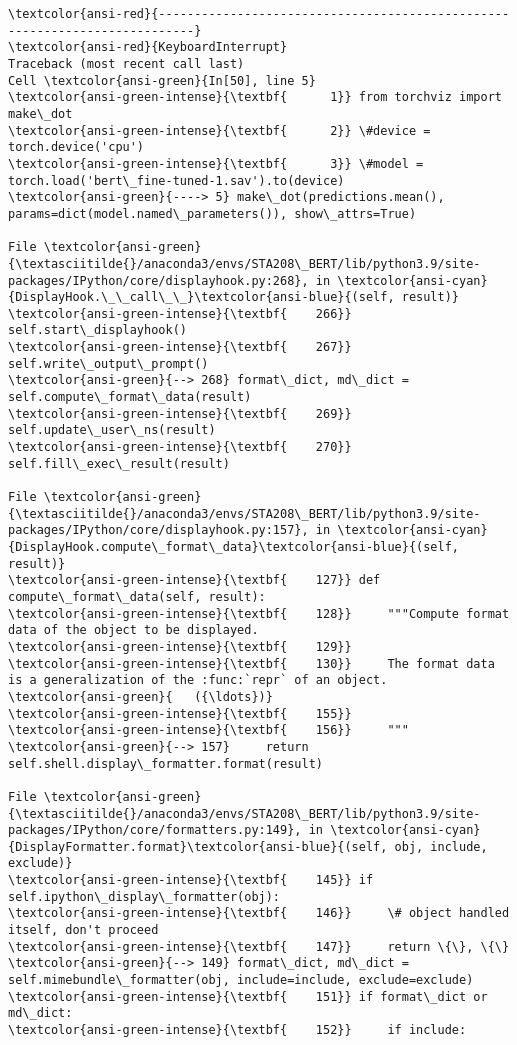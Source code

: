 \documentclass[11pt]{article}
\begin{document}
    \begin{Verbatim}[commandchars=\\\{\}, frame=single, framerule=2mm, rulecolor=\color{outerrorbackground}]
\textcolor{ansi-red}{---------------------------------------------------------------------------}
\textcolor{ansi-red}{KeyboardInterrupt}                         Traceback (most recent call last)
Cell \textcolor{ansi-green}{In[50], line 5}
\textcolor{ansi-green-intense}{\textbf{      1}} from torchviz import make\_dot
\textcolor{ansi-green-intense}{\textbf{      2}} \#device = torch.device('cpu')
\textcolor{ansi-green-intense}{\textbf{      3}} \#model = torch.load('bert\_fine-tuned-1.sav').to(device)
\textcolor{ansi-green}{----> 5} make\_dot(predictions.mean(), params=dict(model.named\_parameters()), show\_attrs=True)

File \textcolor{ansi-green}{\textasciitilde{}/anaconda3/envs/STA208\_BERT/lib/python3.9/site-packages/IPython/core/displayhook.py:268}, in \textcolor{ansi-cyan}{DisplayHook.\_\_call\_\_}\textcolor{ansi-blue}{(self, result)}
\textcolor{ansi-green-intense}{\textbf{    266}} self.start\_displayhook()
\textcolor{ansi-green-intense}{\textbf{    267}} self.write\_output\_prompt()
\textcolor{ansi-green}{--> 268} format\_dict, md\_dict = self.compute\_format\_data(result)
\textcolor{ansi-green-intense}{\textbf{    269}} self.update\_user\_ns(result)
\textcolor{ansi-green-intense}{\textbf{    270}} self.fill\_exec\_result(result)

File \textcolor{ansi-green}{\textasciitilde{}/anaconda3/envs/STA208\_BERT/lib/python3.9/site-packages/IPython/core/displayhook.py:157}, in \textcolor{ansi-cyan}{DisplayHook.compute\_format\_data}\textcolor{ansi-blue}{(self, result)}
\textcolor{ansi-green-intense}{\textbf{    127}} def compute\_format\_data(self, result):
\textcolor{ansi-green-intense}{\textbf{    128}}     """Compute format data of the object to be displayed.
\textcolor{ansi-green-intense}{\textbf{    129}} 
\textcolor{ansi-green-intense}{\textbf{    130}}     The format data is a generalization of the :func:`repr` of an object.
\textcolor{ansi-green}{   ({\ldots})}
\textcolor{ansi-green-intense}{\textbf{    155}} 
\textcolor{ansi-green-intense}{\textbf{    156}}     """
\textcolor{ansi-green}{--> 157}     return self.shell.display\_formatter.format(result)

File \textcolor{ansi-green}{\textasciitilde{}/anaconda3/envs/STA208\_BERT/lib/python3.9/site-packages/IPython/core/formatters.py:149}, in \textcolor{ansi-cyan}{DisplayFormatter.format}\textcolor{ansi-blue}{(self, obj, include, exclude)}
\textcolor{ansi-green-intense}{\textbf{    145}} if self.ipython\_display\_formatter(obj):
\textcolor{ansi-green-intense}{\textbf{    146}}     \# object handled itself, don't proceed
\textcolor{ansi-green-intense}{\textbf{    147}}     return \{\}, \{\}
\textcolor{ansi-green}{--> 149} format\_dict, md\_dict = self.mimebundle\_formatter(obj, include=include, exclude=exclude)
\textcolor{ansi-green-intense}{\textbf{    151}} if format\_dict or md\_dict:
\textcolor{ansi-green-intense}{\textbf{    152}}     if include:


\end{Verbatim}
\end{document}
